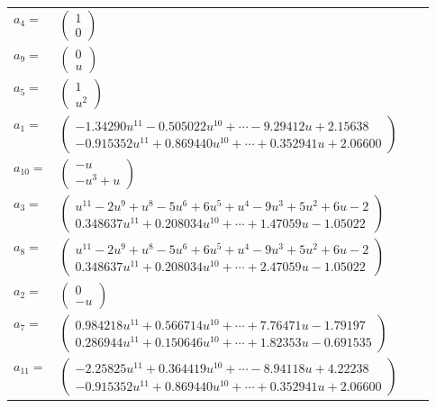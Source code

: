 \documentclass[1p]{elsarticle_modified}
\theoremstyle{definition}
\begin{document}
\begin{tabular}{m{7pt} m{180pt} m{7pt} m{180pt} }
\flushright $a_{4}=$&$\begin{pmatrix}1\\0\end{pmatrix}$ \\
\flushright $a_{9}=$&$\begin{pmatrix}0\\u\end{pmatrix}$ \\
\flushright $a_{5}=$&$\begin{pmatrix}1\\u^2\end{pmatrix}$ \\
\flushright $a_{1}=$&$\begin{pmatrix}-1.34290 u^{11}-0.505022 u^{10}+\cdots-9.29412 u+2.15638\\-0.915352 u^{11}+0.869440 u^{10}+\cdots+0.352941 u+2.06600\end{pmatrix}$ \\
\flushright $a_{10}=$&$\begin{pmatrix}- u\\- u^3+u\end{pmatrix}$ \\
\flushright $a_{3}=$&$\begin{pmatrix}u^{11}-2 u^9+u^8-5 u^6+6 u^5+u^4-9 u^3+5 u^2+6 u-2\\0.348637 u^{11}+0.208034 u^{10}+\cdots+1.47059 u-1.05022\end{pmatrix}$ \\
\flushright $a_{8}=$&$\begin{pmatrix}u^{11}-2 u^9+u^8-5 u^6+6 u^5+u^4-9 u^3+5 u^2+6 u-2\\0.348637 u^{11}+0.208034 u^{10}+\cdots+2.47059 u-1.05022\end{pmatrix}$ \\
\flushright $a_{2}=$&$\begin{pmatrix}0\\- u\end{pmatrix}$ \\
\flushright $a_{7}=$&$\begin{pmatrix}0.984218 u^{11}+0.566714 u^{10}+\cdots+7.76471 u-1.79197\\0.286944 u^{11}+0.150646 u^{10}+\cdots+1.82353 u-0.691535\end{pmatrix}$ \\
\flushright $a_{11}=$&$\begin{pmatrix}-2.25825 u^{11}+0.364419 u^{10}+\cdots-8.94118 u+4.22238\\-0.915352 u^{11}+0.869440 u^{10}+\cdots+0.352941 u+2.06600\end{pmatrix}$ \\

\end{tabular}
\end{document}
